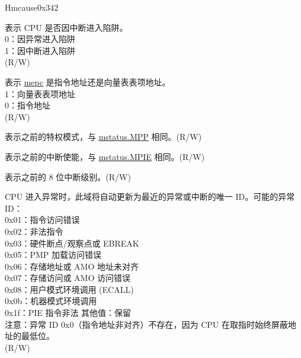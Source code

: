 \begin{register}{H}{mcause}{0x342}\label{regdesc:MCAUSE}
%
%
%
%
%
%
%
%
\regnewline%
\begin{regdesc}\begin{reglist}
\label{fielddesc:MCAUSEINT}\item [INT] 表示 CPU 是否因中断进入陷阱。\\
0：因异常进入陷阱\\
1：因中断进入陷阱\\
(R/W)
\label{fielddesc:MCAUSE_MINHV}\item [MINHV] 表示 \hyperref[fielddesc:MEPC]{mepc} 是指令地址还是向量表表项地址。\\
1：向量表表项地址\\
0：指令地址\\
(R/W)
\label{fielddesc:MCAUSE_MPP}\item [MPP] 表示之前的特权模式，与 \hyperref[fielddesc:MSTATUSMPP]{mstatus.MPP} 相同。(R/W)
\label{fielddesc:MCAUSE_MPIE}\item [MPIE] 表示之前的中断使能，与 \hyperref[fielddesc:MSTATUSMPIE]{mstatus.MPIE} 相同。(R/W)
\label{fielddesc:MCAUSE_MPIL}\item [MPIL] 表示之前的 8 位中断级别。(R/W)
\label{fielddesc:MCAUSECODE}\item [CODE] CPU 进入异常时，此域将自动更新为最近的异常或中断的唯一 ID。可能的异常 ID：\\
0x01：指令访问错误\\
0x02：非法指令\\
0x03：硬件断点/观察点或 EBREAK\\
0x05：PMP 加载访问错误\\
0x06：存储地址或 AMO 地址未对齐\\
0x07：存储访问或 AMO 访问错误\\
0x08：用户模式环境调用 (ECALL)\\
0x0b：机器模式环境调用\\
0x1f：PIE 指令非法
其他值：保留\\
注意：异常 ID 0x0（指令地址非对齐）不存在，因为 CPU 在取指时始终屏蔽地址的最低位。\\
(R/W)
\end{reglist}\end{regdesc}
\end{register}

